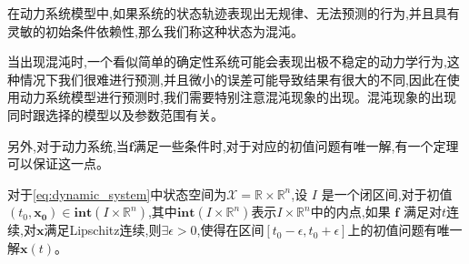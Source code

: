 \begin{defn}[混沌]
    在动力系统模型中,如果系统的状态轨迹表现出无规律、无法预测的行为,并且具有灵敏的初始条件依赖性,那么我们称这种状态为混沌。
\end{defn}

当出现混沌时,一个看似简单的确定性系统可能会表现出极不稳定的动力学行为,这种情况下我们很难进行预测,并且微小的误差可能导致结果有很大的不同,因此在使用动力系统模型进行预测时,我们需要特别注意混沌现象的出现。混沌现象的出现同时跟选择的模型以及参数范围有关。

另外,对于动力系统,当$\mathbf{f}$满足一些条件时,对于对应的初值问题有唯一解,有一个定理可以保证这一点。

\begin{thm}\label{thm:picard_lindelof}
    对于\ref{eq:dynamic_system}中状态空间为$\mathcal{X}=\mathbb{R}\times\mathbb{R}^n$,设 \( I \) 是一个闭区间,对于初值$(t_0,\mathbf{x_0})\in \textbf{int} (I\times\mathbb{R}^n)$,其中$\textbf{int} (I\times\mathbb{R}^n)$表示$I\times\mathbb{R}^n$中的内点,如果 $\mathbf{f}$ 满足对$t$连续,对$\mathbf{x}$满足Lipschitz连续,则$\exists \epsilon>0$,使得在区间$[t_0-\epsilon,t_0+\epsilon]$上的初值问题有唯一解$\mathbf{x}(t)$。
\end{thm}
